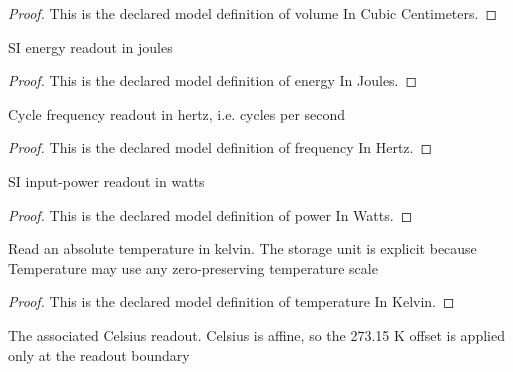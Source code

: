 \begin{proof}
  This is the declared model definition of volume In Cubic Centimeters.
\end{proof}
\begin{definition}
  \label{def:physics:phyx-mini-0431:phyxminiproblems-problemphyxmini0431-energyinjoules}
  SI energy readout in joules
\end{definition}
\begin{proof}
  This is the declared model definition of energy In Joules.
\end{proof}
\begin{definition}
  \label{def:physics:phyx-mini-0431:phyxminiproblems-problemphyxmini0431-frequencyinhertz}
  Cycle frequency readout in hertz, i.e. cycles per second
\end{definition}
\begin{proof}
  This is the declared model definition of frequency In Hertz.
\end{proof}
\begin{definition}
  \label{def:physics:phyx-mini-0431:phyxminiproblems-problemphyxmini0431-powerinwatts}
  SI input-power readout in watts
\end{definition}
\begin{proof}
  This is the declared model definition of power In Watts.
\end{proof}
\begin{definition}
  \label{def:physics:phyx-mini-0431:phyxminiproblems-problemphyxmini0431-temperatureinkelvin}
  Read an absolute temperature in kelvin. The storage unit is explicit because Temperature may use any zero-preserving temperature scale
\end{definition}
\begin{proof}
  This is the declared model definition of temperature In Kelvin.
\end{proof}
\begin{definition}
  \label{def:physics:phyx-mini-0431:phyxminiproblems-problemphyxmini0431-temperatureindegreescelsius}
  The associated Celsius readout. Celsius is affine, so the 273.15 K offset is applied only at the readout boundary
\end{definition}
